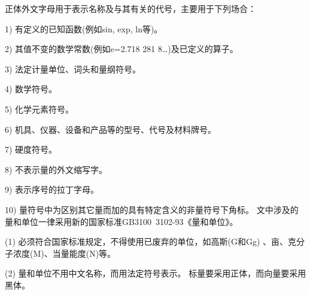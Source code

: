 正体外文字母用于表示名称及与其有关的代号，主要用于下列场合：\par
1) 有定义的已知函数(例如sin, exp, ln等)。\par
2) 其值不变的数学常数(例如e=2.718 281 8…)及已定义的算子。\par
3) 法定计量单位、词头和量纲符号。\par
4) 数学符号。\par
5) 化学元素符号。\par
6) 机具、仪器、设备和产品等的型号、代号及材料牌号。\par
7) 硬度符号。\par
8) 不表示量的外文缩写字。\par
9) 表示序号的拉丁字母。\par
10) 量符号中为区别其它量而加的具有特定含义的非量符号下角标。
文中涉及的量和单位一律采用新的国家标准GB3100~3102-93《量和单位》。\par
(1) 必须符合国家标准规定，不得使用已废弃的单位，如高斯(G和Gg) 、亩、克分子浓度(M)、当量能度(N)等。\par
(2) 量和单位不用中文名称，而用法定符号表示。
标量要采用正体，而向量要采用黑体。
